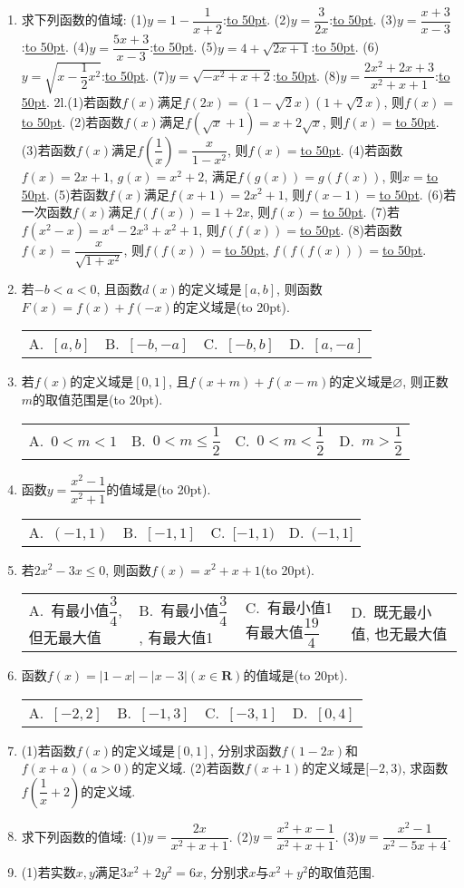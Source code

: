 \documentclass[10pt,a4paper]{article}
\newcommand{\blank}[1]{\underline{\hbox to #1pt{}}}
\newcommand{\bracket}[1]{(\hbox to #1pt{})}
\newcommand{\fourch}[4]{\par\begin{tabular}{p{.23\textwidth}p{.23\textwidth}p{.23\textwidth}p{.23\textwidth}}
A.~#1 &B.~#2& C.~#3& D.~#4
\end{tabular}}
\begin{document}
\begin{enumerate}[1.]
(2)$y=\dfrac 1{\sqrt {2x^2+3}}$:\blank{50}.
(3)$y=\dfrac{x+5}{3x^2-2x-1}$:\blank{50}.
(4)$y=\sqrt {6x-x^2-9}$:\blank{50}.
(5)$y=\sqrt {4-x^2}+\dfrac 1{|x|-1}$:\blank{50}.
(6)$y=\dfrac{x^3-1}{x+|x|}$:\blank{50}.
(7)$y=\dfrac 1{|x|-x^2}$:\blank{50}.
(8)$y=\sqrt {1-(\dfrac{x-1}{x+1})^2}$:\blank{50}.
(9)$y=\dfrac{\sqrt {x^2-2x-15}}{|x+3|-8}$:\blank{50}.
\item 求下列函数的值域:
(1)$y=1-\dfrac 1{x+2}$:\blank{50}.				(2)$y=\dfrac 3{2x}$:\blank{50}.
(3)$y=\dfrac{x+3}{x-3}$:\blank{50}.					(4)$y=\dfrac{5x+3}{x-3}$:\blank{50}.
(5)$y=4+\sqrt {2x+1}$:\blank{50}.				(6)$y=\sqrt {x-\dfrac 12x^2}$:\blank{50}.
(7)$y=\sqrt {-x^2+x+2}$:\blank{50}.			(8)$y=\dfrac{2x^2+2x+3}{x^2+x+1}$:\blank{50}.
2l.(1)若函数$f(x)$满足$f(2x)=(1-\sqrt 2x)(1+\sqrt 2x)$, 则$f(x)=$\blank{50}.
(2)若函数$f(x)$满足$f(\sqrt x+1)=x+2\sqrt x$, 则$f(x)=$\blank{50}.
(3)若函数$f(x)$满足$f(\dfrac 1x)=\dfrac x{1-x^2}$, 则$f(x)=$\blank{50}.
(4)若函数$f(x)=2x+1$, $g(x)=x^2+2$, 满足$f(g(x))=g(f(x))$, 则$x=$\blank{50}.
(5)若函数$f(x)$满足$f(x+1)=2x^2+1$, 则$f(x-1)=$\blank{50}.
(6)若一次函数$f(x)$满足$f(f(x))=1+2x$, 则$f(x)=$\blank{50}.
(7)若$f(x^2-x)=x^4-2x^3+x^2+1$, 则$f(f(x))=$\blank{50}.
(8)若函数$f(x)=\dfrac x{\sqrt {1+x^2}}$, 则$f(f(x))=$\blank{50}, $f(f(f(x)))=$\blank{50}.
\item 若$-b<a<0$, 且函数$d(x)$的定义域是$[ a,b ]$, 则函数$F(x)=f(x)+f(-x)$的定义域是\bracket{20}.
\fourch{$[ a,b ]$}{$[ -b,-a ]$}{$[ -b,b ]$}{$[ a,-a ]$}
\item 若$f(x)$的定义域是$[ 0,1 ]$, 且$f(x+m)+f(x-m)$的定义域是$\varnothing$, 则正数$m$的取值范围是\bracket{20}.
\fourch{$0<m<1$}{$0<m\le \dfrac 12$}{$0<m<\dfrac 12$}{$m>\dfrac 12$}
\item 函数$y=\dfrac{x^2-1}{x^2+1}$的值域是\bracket{20}.
\fourch{$(-1,1)$}{$[ -1,1 ]$}{$[ -1,1)$}{$(-1,1 ]$}
\item 若$2x^2-3x\le 0$, 则函数$f(x)=x^2+x+1$\bracket{20}.
\fourch{有最小值$\dfrac 34$, 但无最大值}{有最小值$\dfrac 34$, 有最大值1}{有最小值1有最大值$\dfrac{19}4$}{既无最小值, 也无最大值}
\item 函数$f(x)=|1-x|-|x-3|(x\in \mathbf{R})$的值域是\bracket{20}.
\fourch{$[ -2,2 ]$}{$[ -1,3 ]$}{$[ -3,1 ]$}{$[ 0,4 ]$}
\item (1)若函数$f(x)$的定义域是$[ 0,1 ]$, 分别求函数$f(1-2x)$和$f(x+a)(a>0)$的定义域.
   (2)若函数$f(x+1)$的定义域是$[ -2,3)$, 求函数$f(\dfrac 1x+2)$的定义域.
\item 求下列函数的值域:
(1)$y=\dfrac{2x}{x^2+x+1}$.			(2)$y=\dfrac{x^2+x-1}{x^2+x+1}$.		(3)$y=\dfrac{x^2-1}{x^2-5x+4}$.
\item (1)若实数$x,y$满足$3x^2+2y^2=6x$, 分别求$x$与$x^2+y^2$的取值范围.

\end{enumerate}
\end{document}
